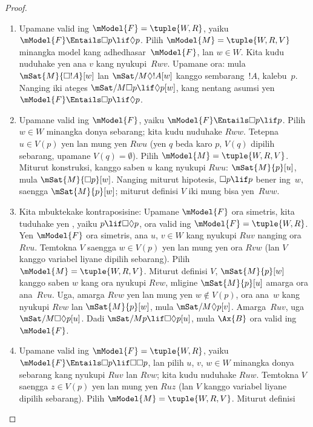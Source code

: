 \documentclass[../../../include/open-logic-section]{subfiles}
\begin{document}
\begin{proof}
  \begin{enumerate}
  \item Upamane  valid ing $\mModel{F} = \tuple{W, R}$, yaiku
    $\mModel{F} \Entails \Box p \lif \Diamond p$. Pilih $\mModel{M} =
    \tuple{W, R, V}$ minangka model kang adhedhasar~$\mModel{F}$, lan
    $w \in W$. Kita kudu nuduhake yen ana $v$ kang nyukupi~$Rwv$.
    Upamane ora: mula $\mSat{M}{\Box !A}[w]$ lan
    $\mSat/{M}{\Diamond !A}[w]$ kanggo sembarang~$!A$, kalebu~$p$.
    Nanging iki ateges $\mSat/{M}{\Box p \lif
      \Diamond p}[w]$, kang nentang asumsi yen $\mModel{F}
    \Entails \Box p \lif \Diamond p$.
  \item Upamane  valid ing $\mModel{F}$, yaiku $\mModel{F} \Entails \Box
    p \lif p$. Pilih $w \in W$ minangka donya sebarang; kita kudu
    nuduhake $Rww$. Tetepna $u \in V(p)$ yen lan mung yen $Rwu$
    (yen $q$ beda karo $p$, $V(q)$ dipilih sebarang, upamane
    $V(q) = \emptyset$). Pilih $\mModel{M} = \tuple{W, R, V}$.
    Miturut konstruksi, kanggo saben $u$ kang nyukupi $Rwu$:
    $\mSat{M}{p}[u]$, mula $\mSat{M}{\Box p}[w]$. Nanging miturut
    hipotesis, $\Box p \lif p$ bener ing~$w$, saengga
    $\mSat{M}{p}[w]$; miturut definisi $V$ iki mung bisa yen~$Rww$.
  \item Kita mbuktekake kontraposisine: Upamane $\mModel{F}$ ora
    simetris, kita tuduhake yen , yaiku $p \lif \Box\Diamond p$,
    ora valid ing $\mModel{F}= \tuple{W, R}$. Yen $\mModel{F}$ ora
    simetris, ana $u$, $v \in W$ kang nyukupi $Ruv$ nanging ora
    $Rvu$. Temtokna $V$ saengga $w \in V(p)$ yen lan mung yen ora
    $Rvw$ (lan $V$ kanggo variabel liyane dipilih sebarang). Pilih
    $\mModel{M} =\tuple{W, R,
      V}$. Miturut definisi $V$, $\mSat{M}{p}[w]$ kanggo saben $w$
    kang ora nyukupi $Rvw$, mligine $\mSat{M}{p}[u]$ amarga ora
    ana~$Rvu$. Uga, amarga $Rvw$ yen lan mung yen $w \notin V(p)$,
    ora ana~$w$ kang nyukupi $Rvw$ lan $\mSat{M}{p}[w]$, mula
    $\mSat/{M}{\Diamond p}[v]$. Amarga~$Ruv$, uga
    $\mSat/{M}{\Box\Diamond p}[u]$. Dadi $\mSat/{M}{p \lif
      \Box\Diamond p}[u]$, mula $\Ax{B}$ ora valid
    ing~$\mModel{F}$.
  \item Upamane  valid ing $\mModel{F} = \tuple{W,R}$, yaiku
    $\mModel{F} \Entails \Box p \lif \Box\Box p$, lan pilih $u$, $v$,
    $w \in W$ minangka donya sebarang kang nyukupi $Ruv$ lan $Rvw$;
    kita kudu nuduhake $Ruw$. Temtokna $V$ saengga $z \in V(p)$ yen
    lan mung yen $Ruz$ (lan $V$ kanggo variabel liyane dipilih
    sebarang). Pilih $\mModel{M} =\tuple{W, R, V}$. Miturut definisi

\end{enumerate}
\end{proof}
\end{document}
